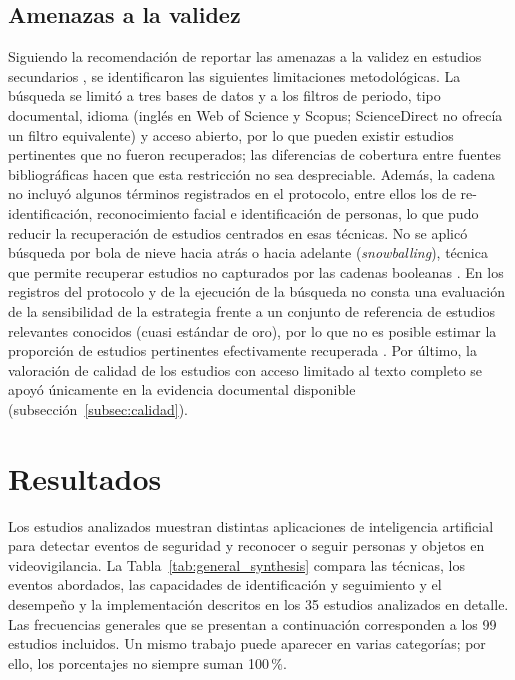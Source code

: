 \documentclass[pdflatex,sn-mathphys-num]{sn-jnl}%
\theoremstyle{thmstyleone}%
\theoremstyle{thmstyletwo}%
\theoremstyle{thmstylethree}%
\begin{document}
\subsection{Amenazas a la validez}\label{subsec:validez}

Siguiendo la recomendación de reportar las amenazas a la validez en estudios secundarios \cite{ampatzoglou2019}, se identificaron las siguientes limitaciones metodológicas. La búsqueda se limitó a tres bases de datos y a los filtros de periodo, tipo documental, idioma (inglés en Web of Science y Scopus; ScienceDirect no ofrecía un filtro equivalente) y acceso abierto, por lo que pueden existir estudios pertinentes que no fueron recuperados; las diferencias de cobertura entre fuentes bibliográficas hacen que esta restricción no sea despreciable. Además, la cadena no incluyó algunos términos registrados en el protocolo, entre ellos los de re-identificación, reconocimiento facial e identificación de personas, lo que pudo reducir la recuperación de estudios centrados en esas técnicas. No se aplicó búsqueda por bola de nieve hacia atrás o hacia adelante (\textit{snowballing}), técnica que permite recuperar estudios no capturados por las cadenas booleanas \cite{wohlin2014}. En los registros del protocolo y de la ejecución de la búsqueda no consta una evaluación de la sensibilidad de la estrategia frente a un conjunto de referencia de estudios relevantes conocidos (cuasi estándar de oro), por lo que no es posible estimar la proporción de estudios pertinentes efectivamente recuperada \cite{zhang2011}. Por último, la valoración de calidad de los estudios con acceso limitado al texto completo se apoyó únicamente en la evidencia documental disponible (subsección~\ref{subsec:calidad}).



\section{Resultados}\label{sec3}

Los estudios analizados muestran distintas aplicaciones de inteligencia artificial
para detectar eventos de seguridad y reconocer o seguir personas y objetos en
videovigilancia. La Tabla~\ref{tab:general_synthesis} compara las técnicas,
los eventos abordados, las capacidades de identificación y seguimiento y el
desempeño y la implementación descritos en los 35 estudios analizados en detalle.
Las frecuencias generales que se presentan a continuación corresponden a los
99 estudios incluidos. Un mismo trabajo puede aparecer en varias categorías;
por ello, los porcentajes no siempre suman 100\,\%.
\end{document}
